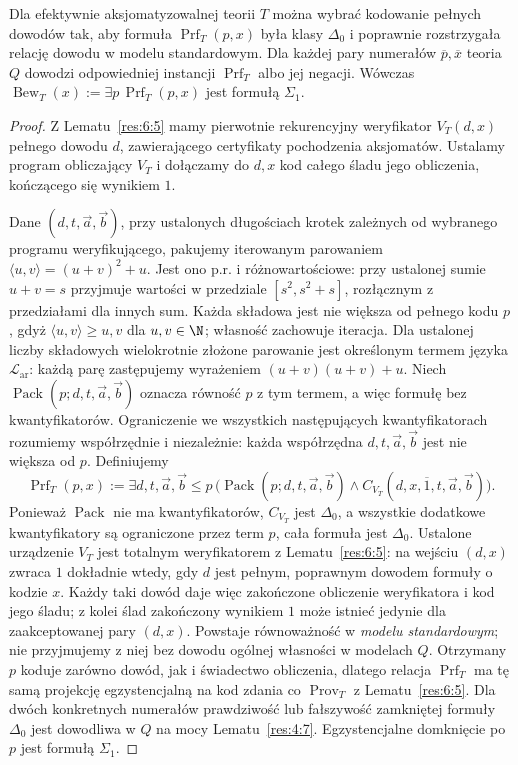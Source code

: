 \begin{lemat}\label{res:7:7}
Dla efektywnie aksjomatyzowalnej teorii $T$ można wybrać kodowanie pełnych dowodów tak, aby formuła $\operatorname{Prf}_T(p,x)$ była klasy $\Delta_0$ i poprawnie rozstrzygała relację dowodu w modelu standardowym. Dla każdej pary numerałów $\overline p,\overline x$ teoria $Q$ dowodzi odpowiedniej instancji $\operatorname{Prf}_T$ albo jej negacji. Wówczas $\operatorname{Bew}_T(x):=\exists p\,\operatorname{Prf}_T(p,x)$ jest formułą $\Sigma_1$.
\end{lemat}
\begin{proof}
Z Lematu~\ref{res:6:5} mamy pierwotnie rekurencyjny weryfikator $V_T(d,x)$ pełnego dowodu $d$, zawierającego certyfikaty pochodzenia aksjomatów. Ustalamy program obliczający $V_T$ i dołączamy do $d,x$ kod całego śladu jego obliczenia, kończącego się wynikiem $1$.

Dane $(d,t,\vec a,\vec b)$, przy ustalonych długościach krotek zależnych od wybranego programu weryfikującego,
pakujemy iterowanym parowaniem
$\langle u,v\rangle=(u+v)^2+u$. Jest ono p.r. i różnowartościowe:
przy ustalonej sumie $u+v=s$ przyjmuje wartości w przedziale
$[s^2,s^2+s]$, rozłącznym z przedziałami dla innych sum.
Każda składowa jest nie większa od pełnego kodu $p$,
gdyż $\langle u,v\rangle\ge u,v$ dla $u,v\in\N$;
własność zachowuje iteracja. Dla ustalonej liczby składowych
wielokrotnie złożone parowanie jest określonym termem
języka $\mathcal L_{\mathrm{ar}}$: każdą parę zastępujemy
wyrażeniem $(u+v)(u+v)+u$. Niech
$\operatorname{Pack}(p;d,t,\vec a,\vec b)$
oznacza równość $p$ z tym termem, a więc formułę
bez kwantyfikatorów. Ograniczenie we wszystkich następujących
kwantyfikatorach rozumiemy współrzędnie i niezależnie:
każda współrzędna $d,t,\vec a,\vec b$ jest nie większa od $p$. Definiujemy
\[
\operatorname{Prf}_T(p,x):=\exists d,t,\vec a,\vec b\le p\,
\bigl(\operatorname{Pack}(p;d,t,\vec a,\vec b)\land
C_{V_T}(d,x,\overline1,t,\vec a,\vec b)\bigr).
\]
Ponieważ $\operatorname{Pack}$ nie ma kwantyfikatorów, $C_{V_T}$
jest $\Delta_0$, a wszystkie dodatkowe kwantyfikatory są
ograniczone przez term $p$, cała formuła jest $\Delta_0$.
Ustalone urządzenie $V_T$ jest totalnym weryfikatorem z Lematu~\ref{res:6:5}:
na wejściu $(d,x)$ zwraca $1$ dokładnie wtedy, gdy $d$
jest pełnym, poprawnym dowodem formuły o kodzie $x$.
Każdy taki dowód daje więc zakończone obliczenie weryfikatora
i kod jego śladu; z kolei ślad zakończony wynikiem $1$
może istnieć jedynie dla zaakceptowanej pary $(d,x)$.
Powstaje równoważność w \emph{modelu standardowym}; nie
przyjmujemy z niej bez dowodu ogólnej własności w modelach $Q$.
Otrzymany $p$ koduje zarówno dowód, jak i świadectwo
obliczenia, dlatego relacja $\operatorname{Prf}_T$ ma tę samą
projekcję egzystencjalną na kod zdania co
$\operatorname{Prov}_T$ z Lematu~\ref{res:6:5}.
Dla dwóch konkretnych numerałów prawdziwość lub fałszywość
zamkniętej formuły $\Delta_0$ jest dowodliwa w $Q$ na mocy
Lematu~\ref{res:4:7}. Egzystencjalne domknięcie po $p$
jest formułą $\Sigma_1$.
\end{proof}

